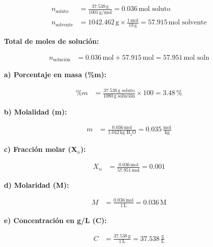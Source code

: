 \documentclass{article}
\begin{document}
\begin{multicols}{2}
\begin{align*}
    n_{\text{soluto}} &= \frac{37.538 \, \text{g}}{1001 \, \text{g/mol}} = 0.036 \, \text{mol soluto} \\[10pt]
    n_{\text{solvente}} &= 1042.462 \, \text{g} \times \frac{1 \, \text{mol}}{18 \, \text{g}} = 57.915 \, \text{mol solvente}
\end{align*}

\textbf{Total de moles de solución:}

\begin{align*}
    n_{\text{solución}} &= 0.036 \, \text{mol} + 57.915 \, \text{mol} = 57.951 \, \text{mol soln}
\end{align*}

\textbf{a) Porcentaje en masa (\%m):}

\begin{align*}
    \%m &= \frac{37.538 \, \text{g soluto}}{1080 \, \text{g solución}} \times 100 = 3.48 \, \%
\end{align*}

\textbf{b) Molalidad (m):}

\begin{align*}
    m &= \frac{0.036 \, \text{mol}}{1.042 \, \text{kg H}_2\text{O}} = 0.035 \, \frac{\text{mol}}{\text{kg}}
\end{align*}

\textbf{c) Fracción molar (X$_n$):}

\begin{align*}
    X_n &= \frac{0.036 \, \text{mol}}{57.951 \, \text{mol}} = 0.001
\end{align*}

\textbf{d) Molaridad (M):}

\begin{align*}
    M &= \frac{0.036 \, \text{mol}}{1 \, \text{L}} = 0.036 \, \text{M}
\end{align*}

\textbf{e) Concentración en g/L (C):}

\begin{align*}
    C &= \frac{37.538 \, \text{g}}{1 \, \text{L}} = 37.538 \, \frac{\text{g}}{\text{L}}
\end{align*}

\end{multicols} %
\end{document}
